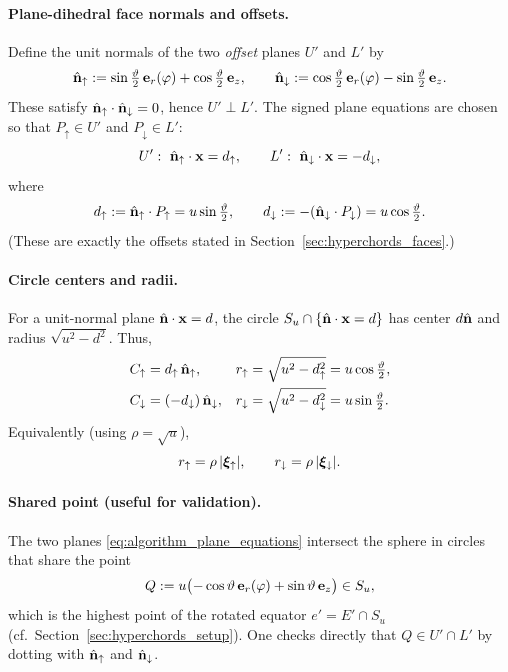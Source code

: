 \paragraph{Plane-dihedral face normals and offsets.}
Define the unit normals of the two \emph{offset} planes $U'$ and $L'$ by
\begin{equation}
\label{eq:algorithm_plane_normals}
\hat{\mathbf{n}}_\uparrow := \sin\tfrac{\vartheta}{2}\,\mathbf{e}_r(\varphi)+\cos\tfrac{\vartheta}{2}\,\mathbf{e}_{z},
\qquad
\hat{\mathbf{n}}_\downarrow := \cos\tfrac{\vartheta}{2}\,\mathbf{e}_r(\varphi)-\sin\tfrac{\vartheta}{2}\,\mathbf{e}_{z}.
\end{equation}
These satisfy $\hat{\mathbf{n}}_\uparrow\cdot\hat{\mathbf{n}}_\downarrow=0$, hence $U'\perp L'$.
The signed plane equations are chosen so that $P_\uparrow\in U'$ and $P_\downarrow\in L'$:
\begin{equation}
\label{eq:algorithm_plane_equations}
U':\ \hat{\mathbf{n}}_\uparrow\cdot \mathbf{x} = d_\uparrow,
\qquad
L':\ \hat{\mathbf{n}}_\downarrow\cdot \mathbf{x} = -d_\downarrow,
\end{equation}
where
\begin{equation}
d_\uparrow:=\hat{\mathbf{n}}_\uparrow\cdot P_\uparrow = u\sin\tfrac{\vartheta}{2},
\qquad
d_\downarrow:=-(\hat{\mathbf{n}}_\downarrow\cdot P_\downarrow)=u\cos\tfrac{\vartheta}{2}.
\end{equation}
(These are exactly the offsets stated in Section~\ref{sec:hyperchords_faces}.)

\paragraph{Circle centers and radii.}
For a unit-normal plane $\hat{\mathbf{n}}\cdot\mathbf{x}=d$, the circle $S_u\cap\{\hat{\mathbf{n}}\cdot\mathbf{x}=d\}$ has center $d\hat{\mathbf{n}}$ and radius $\sqrt{u^2-d^2}$.
Thus,
\begin{align}
C_\uparrow &= d_\uparrow\,\hat{\mathbf{n}}_\uparrow, &
r_\uparrow &= \sqrt{u^2-d_\uparrow^2}=u\cos\tfrac{\vartheta}{2},
\\
C_\downarrow &= (-d_\downarrow)\,\hat{\mathbf{n}}_\downarrow, &
r_\downarrow &= \sqrt{u^2-d_\downarrow^2}=u\sin\tfrac{\vartheta}{2}.
\end{align}
Equivalently (using $\rho=\sqrt{u}$),
\begin{equation}
r_\uparrow = \rho\,|\bm{\xi}_\uparrow|,
\qquad
r_\downarrow = \rho\,|\bm{\xi}_\downarrow|.
\end{equation}

\paragraph{Shared point (useful for validation).}
The two planes \eqref{eq:algorithm_plane_equations} intersect the sphere in circles that share the point
\begin{equation}
\label{eq:algorithm_shared_point}
Q := u\bigl(-\cos\vartheta\,\mathbf{e}_r(\varphi)+\sin\vartheta\,\mathbf{e}_{z}\bigr)\in S_u,
\end{equation}
which is the highest point of the rotated equator $e'=E'\cap S_u$ (cf.\ Section~\ref{sec:hyperchords_setup}).
One checks directly that $Q\in U'\cap L'$ by dotting with $\hat{\mathbf{n}}_\uparrow$ and $\hat{\mathbf{n}}_\downarrow$.


